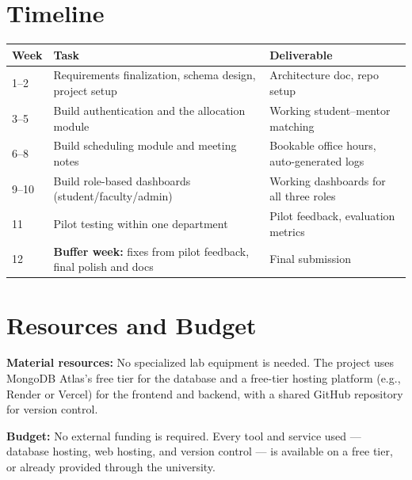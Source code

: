 \documentclass[11pt]{article}
\begin{document}
\section{Timeline}
\begin{center}
\begin{tabular}{@{}p{1.6cm}p{6.2cm}p{6.2cm}@{}}
\toprule
\textbf{Week} & \textbf{Task} & \textbf{Deliverable} \\
\midrule
1--2 & Requirements finalization, schema design, project setup & Architecture doc, repo setup \\
3--5 & Build authentication and the allocation module & Working student--mentor matching \\
6--8 & Build scheduling module and meeting notes & Bookable office hours, auto-generated logs \\
9--10 & Build role-based dashboards (student/faculty/admin) & Working dashboards for all three roles \\
11 & Pilot testing within one department & Pilot feedback, evaluation metrics \\
12 & \textbf{Buffer week:} fixes from pilot feedback, final polish and docs & Final submission \\
\bottomrule
\end{tabular}
\end{center}

\section{Resources and Budget}
\textbf{Material resources:} No specialized lab equipment is needed. The project uses MongoDB Atlas's free tier for the database and a free-tier hosting platform (e.g., Render or Vercel) for the frontend and backend, with a shared GitHub repository for version control.

\textbf{Budget:} No external funding is required. Every tool and service used --- database hosting, web hosting, and version control --- is available on a free tier, or already provided through the university.
\end{document}
